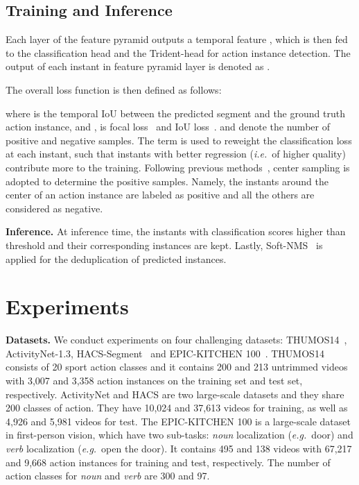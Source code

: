 \documentclass[10pt,twocolumn,letterpaper]{article}
\def\ie{{\em i.e.}}
\def\eg{{\em e.g.}}
\newcommand{\myPara}[1]{\vspace{.05in}\noindent\textbf{#1}}
\begin{document}
\subsection{Training and Inference}
Each layer  of the feature pyramid outputs a temporal feature , which is then fed to the classification head and the Trident-head for action instance detection. The output of each instant  in feature pyramid layer  is denoted as . 

The overall loss function is then defined as follows:

where  is the temporal IoU between the predicted segment and the ground truth action instance, and ,  is focal loss~\cite{lin2017focal} and IoU loss~\cite{rezatofighi2019generalized}.  and  denote the number of positive and negative samples.
The term  is used to reweight the classification loss at each instant, such that instants with better regression (\ie~of higher quality) contribute more to the training. 
Following previous methods~\cite{tian2019fcos,zhang2020bridging,zhang2022actionformer}, center sampling is adopted to determine the positive samples. Namely, the instants around the center of an action instance are labeled as positive and all the others are considered as negative.

\myPara{Inference.} At inference time, the instants with classification scores higher than threshold  and their corresponding instances are kept. Lastly, Soft-NMS~\cite{bodla2017soft} is applied for the deduplication of predicted instances.




\section{Experiments}
\label{sec:exp}
\myPara{Datasets.}
We conduct experiments on four challenging datasets: THUMOS14~\cite{THUMOS14}, ActivityNet-1.3\cite{caba2015activitynet}, HACS-Segment~\cite{zhao2019hacs} and EPIC-KITCHEN 100~\cite{Damen2022RESCALING}. THUMOS14 consists of 20 sport action classes and it contains 200 and 213 untrimmed videos with 3,007 and 3,358 action instances on the training set and test set, respectively. ActivityNet and HACS are two large-scale datasets and they share 200 classes of action. They have 10,024 and 37,613 videos for training, as well as 4,926 and 5,981 videos for test. The EPIC-KITCHEN 100 is a large-scale dataset in first-person vision, which have two sub-tasks: \emph{noun} localization (\eg~door) and \emph{verb} localization (\eg~open the door). It contains 495 and 138 videos with 67,217 and 9,668 action instances for training and test, respectively. The number of action classes for \emph{noun} and \emph{verb} are 300 and 97.  
\end{document}
